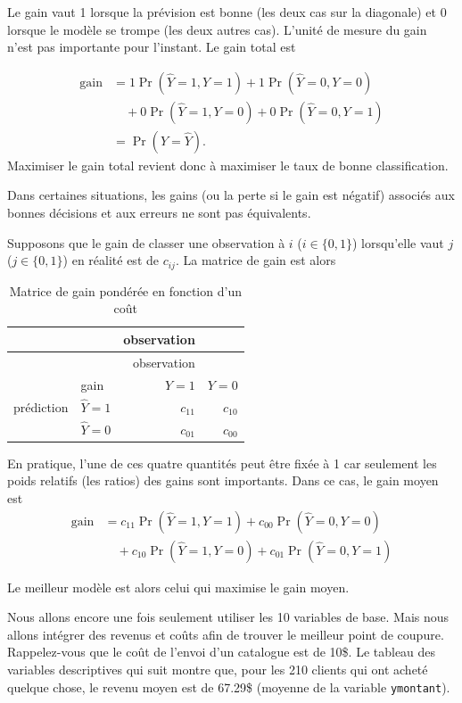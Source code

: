 \documentclass[
  11pt,
  letterpaper,
]{scrbook}
\theoremstyle{definition}
\theoremstyle{remark}
\begin{document}
Le gain vaut 1 lorsque la prévision est bonne (les deux cas sur la
diagonale) et 0 lorsque le modèle se trompe (les deux autres cas).
L'unité de mesure du gain n'est pas importante pour l'instant. Le gain
total est

\begin{align*}
\text{gain} &= 1 \Pr(\widehat{Y}=1, Y=1) + 1 \Pr(\widehat{Y}=0, Y=0)
\\ &\quad + 0 \Pr(\widehat{Y}=1, Y=0)  + 0 \Pr(\widehat{Y}=0, Y=1)
\\& = \Pr(Y = \widehat{Y}).
\end{align*} Maximiser le gain total revient donc à maximiser le taux de
bonne classification.

Dans certaines situations, les gains (ou la perte si le gain est
négatif) associés aux bonnes décisions et aux erreurs ne sont pas
équivalents.

Supposons que le gain de classer une observation à \(i\)
(\(i \in \{0,1\}\)) lorsqu'elle vaut \(j\) (\(j \in \{0,1\}\)) en
réalité est de \(c_{ij}\). La matrice de gain est alors

\begin{longtable}[]{@{}llrr@{}}
\caption{Matrice de gain pondérée en fonction d'un
coût}\label{tbl-03-gain2}\tabularnewline
\toprule\noalign{}
& & observation & \\
\midrule\noalign{}
\endfirsthead
\toprule\noalign{}
& & observation & \\
\midrule\noalign{}
\endhead
\bottomrule\noalign{}
\endlastfoot
& gain & \(Y=1\) & \(Y=0\) \\
prédiction & \(\widehat{Y}=1\) & \(c_{11}\) & \(c_{10}\) \\
& \(\widehat{Y}=0\) & \(c_{01}\) & \(c_{00}\) \\
\end{longtable}

En pratique, l'une de ces quatre quantités peut être fixée à 1 car
seulement les poids relatifs (les ratios) des gains sont importants.
Dans ce cas, le gain moyen est \begin{align*}
\text{gain} &= c_{11} \Pr(\widehat{Y}=1, Y=1) + c_{00}\Pr(\widehat{Y}=0, Y=0) 
\\ &\quad + c_{10} \Pr(\widehat{Y}=1, Y=0)  + c_{01} \Pr(\widehat{Y}=0, Y=1)
\end{align*}

Le meilleur modèle est alors celui qui maximise le gain moyen.

Nous allons encore une fois seulement utiliser les 10 variables de base.
Mais nous allons intégrer des revenus et coûts afin de trouver le
meilleur point de coupure. Rappelez-vous que le coût de l'envoi d'un
catalogue est de 10\$. Le tableau des variables descriptives qui suit
montre que, pour les 210 clients qui ont acheté quelque chose, le revenu
moyen est de 67.29\$ (moyenne de la variable \texttt{ymontant}).
\end{document}
